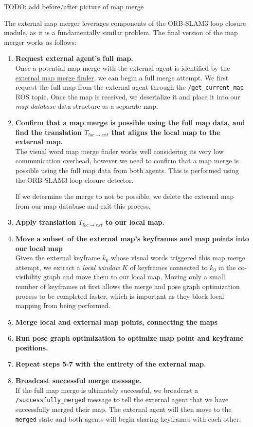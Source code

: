 TODO: add before/after picture of map merge

The external map merger leverages components of the ORB-SLAM3 loop closure module, as it is a fundamentally similar problem. The final version of the map merger works as follows:

\begin{enumerate}
    \item \textbf{Request external agent's full map.} \\
          Once a potential map merge with the external agent is identified by the \hyperref[sec:external-map-merge-finder]{external map merge finder}, we can begin a full merge attempt. We first request the full map from the external agent through the \texttt{/get\_current\_map} ROS topic. Once the map is received, we deserialize it and place it into our \textit{map database} data structure as a separate map.
    \item \textbf{Confirm that a map merge is possible using the full map data, and find the translation $T_{loc \rightarrow ext}$ that aligns the local map to the external map.} \\
          The visual word map merge finder works well considering its very low communication overhead, however we need to confirm that a map merge is possible using the full map data from both agents. This is performed using the ORB-SLAM3 loop closure detector.

          If we determine the merge to not be possible, we delete the external map from our map database and exit this process.
    \item \textbf{Apply translation $T_{loc \rightarrow ext}$ to our local map.}
    \item \textbf{Move a subset of the external map's keyframes and map points into our local map} \\
          Given the external keyframe $k_0$ whose visual words triggered this map merge attempt, we extract a \textit{local window} $K$ of keyframes connected to $k_0$ in the co-visibility graph and move them to our local map. Moving only a small number of keyframes at first allows the merge and pose graph optimization process to be completed faster, which is important as they block local mapping from being performed.
    \item \textbf{Merge local and external map points, connecting the maps}
    \item \textbf{Run pose graph optimization to optimize map point and keyframe positions.}
    \item \textbf{Repeat steps 5-7 with the entirety of the external map.}
    \item \textbf{Broadcast successful merge message.} \\
          If the full map merge is ultimately successful, we broadcast a \texttt{/successfully\_merged} message to tell the external agent that we have successfully merged their map. The external agent will then move to the \texttt{merged} state and both agents will begin sharing keyframes with each other.

\end{enumerate}

